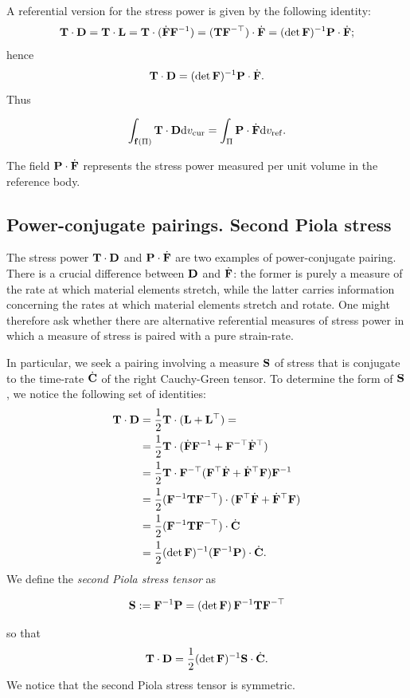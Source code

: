 A referential version for the stress power is given by the following identity:
\begin{equation}
	\mathbf{T}\cdot\mathbf{D}=\mathbf{T}\cdot\mathbf{L}=\mathbf{T}\cdot(\dot{\mathbf{F}}\mathbf{F}^{-1})=(\mathbf{T}\mathbf{F}^{-\top})\cdot\dot{\mathbf{F}}=(\det\mathbf{F})^{-1}\mathbf{P}\cdot\dot{\mathbf{F}};
\end{equation}
hence
\begin{equation}\label{CaPi}
	\mathbf{T}\cdot\mathbf{D}=(\det\mathbf{F})^{-1}\mathbf{P}\cdot\dot{\mathbf{F}}.
\end{equation}
Thus
\begin{definition}
\begin{equation}
	\int_{\mathbf{f}(\Pi)}\mathbf{T}\cdot\mathbf{D}\mathrm{d} v_{\rm cur}=\int_{\Pi}\mathbf{P}\cdot\dot{\mathbf{F}}\mathrm{d} v_{\rm ref}.
\end{equation}
\end{definition}
The field $\mathbf{P}\cdot\dot{\mathbf{F}}$ represents the stress power measured per unit volume in the reference body.


\subsection{Power-conjugate pairings. Second Piola stress}
The stress power $\mathbf{T}\cdot\mathbf{D}$ and $\mathbf{P}\cdot\dot{\mathbf{F}}$ are two examples of power-conjugate pairing. There is a crucial difference between $\mathbf{D}$ and $\dot{\mathbf{F}}$: the former is purely a measure of the rate at which material elements stretch, while the latter carries information concerning the rates at which material elements stretch and rotate. One might therefore ask whether there are alternative referential measures of stress power in which a measure of stress is paired with a pure strain-rate.

In particular, we seek a pairing involving a measure $\mathbf{S}$ of stress that is conjugate to the time-rate $\dot{\mathbf{C}}$ of the right Cauchy-Green tensor. To determine the form of $\mathbf{S}$, we notice the following set of identities:
\begin{equation}
	\begin{aligned}
		\mathbf{T}\cdot\mathbf{D}&=\frac 12 \mathbf{T}\cdot(\mathbf{L}+\mathbf{L}^\top)=\\
		&=\frac 12 \mathbf{T}\cdot(\dot{\mathbf{F}}\mathbf{F}^{-1}+\mathbf{F}^{-\top}\dot{\mathbf{F}}^\top)\\
		&=\frac 12 \mathbf{T}\cdot\mathbf{F}^{-\top}(\mathbf{F}^\top\dot{\mathbf{F}}+\dot{\mathbf{F}}^\top\mathbf{F})\mathbf{F}^{-1}\\
		&=\frac 12 (\mathbf{F}^{-1}\mathbf{T}\mathbf{F}^{-\top})\cdot(\mathbf{F}^\top\dot{\mathbf{F}}+\dot{\mathbf{F}}^\top\mathbf{F})\\
		&=\frac 12 (\mathbf{F}^{-1}\mathbf{T}\mathbf{F}^{-\top})\cdot\dot{\mathbf{C}}\\
		&=\frac 12(\det\mathbf{F})^{-1}(\mathbf{F}^{-1}\mathbf{P})\cdot\dot{\mathbf{C}}.
	\end{aligned}
\end{equation}
We define the \textit{second Piola stress tensor} as 
\begin{definition}
\begin{equation}
	\mathbf{S}:=\mathbf{F}^{-1}\mathbf{P}=(\det \mathbf{F})\,\mathbf{F}^{-1}\mathbf{T} \mathbf{F}^{-\top}
\end{equation}
\end{definition}
so that
\begin{equation}
	\mathbf{T}\cdot\mathbf{D}=\frac{1}{2}(\det\mathbf{F})^{-1}\mathbf{S}\cdot\dot{\mathbf{C}}.
\end{equation}
We notice that the second Piola stress tensor is symmetric.

